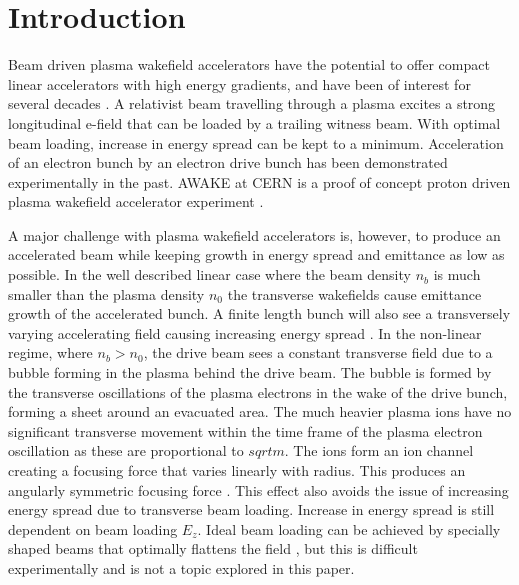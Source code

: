 \documentclass[aps,prstab,reprint,amsmath,amssymb,groupedaddress]{revtex4-1}
\begin{document}
\section[\label{S:I}]{Introduction}

Beam driven plasma wakefield accelerators have the potential to offer compact linear accelerators with high energy
gradients, and have been of interest for several decades \cite{chen:1985}. A relativist beam travelling through a plasma
excites a strong longitudinal e-field that can be loaded by a trailing witness beam. With optimal beam loading, increase
in energy spread can be kept to a minimum. Acceleration of an electron bunch by an electron drive bunch has been
demonstrated experimentally \cite{rosenzweig:1988, blumenfeld:2007, kallos:2008} in the past. AWAKE at CERN is a proof
of concept proton driven plasma wakefield accelerator experiment \cite{awake_collaboration:2014}.

A major challenge with plasma wakefield accelerators is, however, to produce an accelerated beam while keeping growth in
energy spread and emittance as low as possible. In the well described linear case where the beam density $n_{b}$ is much
smaller than the plasma density $n_{0}$ the transverse wakefields cause emittance growth of the accelerated bunch. A
finite length bunch will also see a transversely varying accelerating field causing increasing energy spread
\cite{katsouleas:1987}. In the non-linear regime, where $n_{b} > n_{0}$, the drive beam sees a constant transverse field
due to a bubble forming in the plasma behind the drive beam. The bubble is formed by the transverse oscillations of the
plasma electrons in the wake of the drive bunch, forming a sheet around an evacuated area. The much heavier plasma ions
have no significant transverse movement within the time frame of the plasma electron oscillation as these are
proportional to $sqrt{m}$. The ions form an ion channel creating a focusing force that varies linearly with radius. This
produces an angularly symmetric focusing force \cite{lu:2006-1, lu:2006}. This effect also avoids the issue of
increasing energy spread due to transverse beam loading. Increase in energy spread is still dependent on beam loading
$E_{z}$. Ideal beam loading can be achieved by specially shaped beams that optimally flattens the field
\cite{katsouleas:1987, tzoufras:2009}, but this is difficult experimentally and is not a topic explored in this paper.
\end{document}
